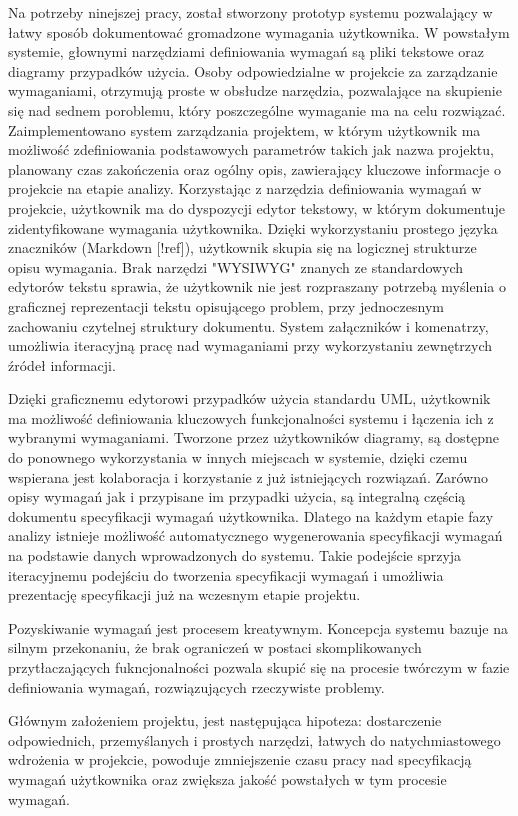       Na potrzeby ninejszej pracy, został stworzony prototyp systemu pozwalający w łatwy sposób dokumentować gromadzone wymagania użytkownika. W powstałym systemie, głownymi narzędziami definiowania wymagań są pliki tekstowe oraz diagramy przypadków użycia. Osoby odpowiedzialne w projekcie za zarządzanie wymaganiami, otrzymują proste w obsłudze narzędzia, pozwalające na skupienie się nad sednem poroblemu, który poszczególne wymaganie ma na celu rozwiązać. Zaimplementowano system zarządzania projektem, w którym użytkownik ma możliwość zdefiniowania podstawowych parametrów takich jak nazwa projektu, planowany czas zakończenia oraz ogólny opis, zawierający kluczowe informacje o projekcie na etapie analizy. Korzystając z narzędzia definiowania wymagań w projekcie, użytkownik ma do dyspozycji edytor tekstowy, w którym dokumentuje zidentyfikowane wymagania użytkownika. Dzięki wykorzystaniu prostego języka znaczników (Markdown [!ref]), użytkownik skupia się na logicznej strukturze opisu wymagania. Brak narzędzi "WYSIWYG" znanych ze standardowych edytorów tekstu sprawia, że użytkownik nie jest rozpraszany potrzebą myślenia o graficznej reprezentacji tekstu opisującego problem, przy jednoczesnym zachowaniu czytelnej struktury dokumentu. System załączników i komenatrzy, umożliwia iteracyjną pracę nad wymaganiami przy wykorzystaniu zewnętrzych źródeł informacji. 

      Dzięki graficznemu edytorowi przypadków użycia standardu UML, użytkownik ma możliwość definiowania kluczowych funkcjonalności systemu i łączenia ich z wybranymi wymaganiami. Tworzone przez użytkowników diagramy, są dostępne do ponownego wykorzystania w innych miejscach w systemie, dzięki czemu wspierana jest kolaboracja i korzystanie z już istniejących rozwiązań. Zarówno opisy wymagań jak i przypisane im przypadki użycia, są integralną częścią dokumentu specyfikacji wymagań użytkownika. Dlatego na każdym etapie fazy analizy istnieje możliwość automatycznego wygenerowania specyfikacji wymagań na podstawie danych wprowadzonych do systemu. Takie podejście sprzyja iteracyjnemu podejściu do tworzenia specyfikacji wymagań i umożliwia prezentację specyfikacji już na wczesnym etapie projektu. 

      Pozyskiwanie wymagań jest procesem kreatywnym. Koncepcja systemu bazuje na silnym przekonaniu, że brak ograniczeń w postaci skomplikowanych przytłaczających fukncjonalności pozwala skupić się na procesie twórczym w fazie definiowania wymagań, rozwiązujących rzeczywiste problemy. 

      Głównym założeniem projektu, jest następująca hipoteza: dostarczenie odpowiednich, przemyślanych i prostych narzędzi, łatwych do natychmiastowego wdrożenia w projekcie, powoduje zmniejszenie czasu pracy nad specyfikacją wymagań użytkownika oraz zwiększa jakość powstałych w tym procesie wymagań. 

